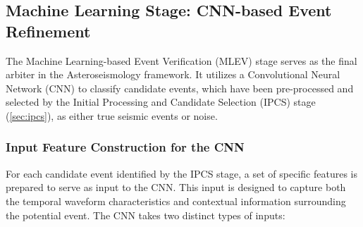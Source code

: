 \documentclass[conference]{IEEEtran}
\begin{document}
            
    \subsection{Machine Learning Stage: CNN-based Event Refinement}
        The Machine Learning-based Event Verification (MLEV) stage serves as the final arbiter in the Asteroseismology
        framework. It utilizes a Convolutional Neural Network (CNN) to classify candidate events, which have been
        pre-processed and selected by the Initial Processing and Candidate Selection (IPCS) stage (\ref{sec:ipcs}), as
        either true seismic events or noise.
    \subsubsection{Input Feature Construction for the CNN}
        For each candidate event identified by the IPCS stage, a set of specific features is prepared to serve as input
        to the CNN. This input is designed to capture both the temporal waveform characteristics and contextual
        information surrounding the potential event. The CNN takes two distinct types of inputs:
\end{document}
